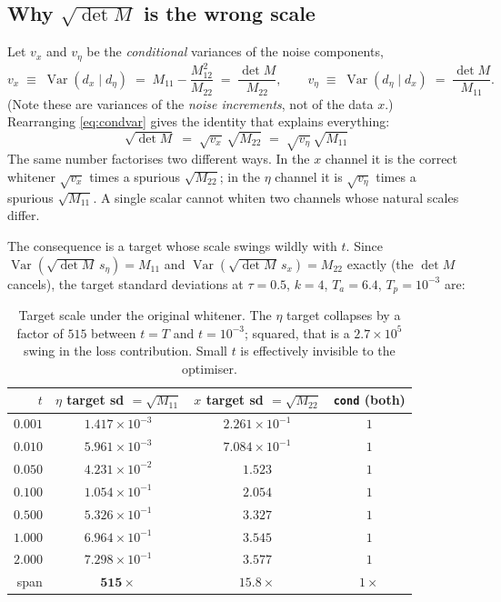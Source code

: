 \documentclass[11pt]{article}
\newcommand{\Tp}{T_p}
\newcommand{\Ta}{T_a}
\newcommand{\kk}{k}
\newcommand{\tauu}{\tau}
\DeclareMathOperator{\Var}{Var}
\begin{document}
\subsection{Why $\sqrt{\det M}$ is the wrong scale}

Let $v_x$ and $v_\eta$ be the \emph{conditional} variances of the noise components,
\begin{equation}
v_x \;\equiv\; \Var(d_x \mid d_\eta) \;=\; M_{11}-\frac{M_{12}^{2}}{M_{22}} \;=\; \frac{\det M}{M_{22}},
\qquad
v_\eta \;\equiv\; \Var(d_\eta \mid d_x) \;=\; \frac{\det M}{M_{11}} .
\label{eq:condvar}
\end{equation}
(Note these are variances of the \emph{noise increments}, not of the data $x$.) Rearranging
\eqref{eq:condvar} gives the identity that explains everything:
\begin{equation}
\boxed{\;\sqrt{\det M} \;=\; \sqrt{v_x}\,\sqrt{M_{22}} \;=\; \sqrt{v_\eta}\,\sqrt{M_{11}}\;}
\label{eq:identity}
\end{equation}
The same number factorises two different ways. In the $x$ channel it is the correct
whitener $\sqrt{v_x}$ times a spurious $\sqrt{M_{22}}$; in the $\eta$ channel it is
$\sqrt{v_\eta}$ times a spurious $\sqrt{M_{11}}$. A single scalar cannot whiten two
channels whose natural scales differ.

The consequence is a target whose scale swings wildly with $t$. Since
$\Var(\sqrt{\det M}\,s_\eta)=M_{11}$ and $\Var(\sqrt{\det M}\,s_x)=M_{22}$ exactly
(the $\det M$ cancels), the target standard deviations at $\tauu=0.5$, $\kk=4$,
$\Ta=6.4$, $\Tp=10^{-3}$ are:

\begin{table}[h]
\centering\small
\begin{tabular}{rccc}
\toprule
$t$ & $\eta$ target sd $=\sqrt{M_{11}}$ & $x$ target sd $=\sqrt{M_{22}}$ & \texttt{cond} (both)\\
\midrule
$0.001$ & $1.417\times10^{-3}$ & $2.261\times10^{-1}$ & $1$\\
$0.010$ & $5.961\times10^{-3}$ & $7.084\times10^{-1}$ & $1$\\
$0.050$ & $4.231\times10^{-2}$ & $1.523$              & $1$\\
$0.100$ & $1.054\times10^{-1}$ & $2.054$              & $1$\\
$0.500$ & $5.326\times10^{-1}$ & $3.327$              & $1$\\
$1.000$ & $6.964\times10^{-1}$ & $3.545$              & $1$\\
$2.000$ & $7.298\times10^{-1}$ & $3.577$              & $1$\\
\midrule
span & $\mathbf{515\times}$ & $15.8\times$ & $1\times$\\
\bottomrule
\end{tabular}
\caption{Target scale under the original whitener. The $\eta$ target collapses by a factor
of $515$ between $t=T$ and $t=10^{-3}$; squared, that is a $2.7\times10^{5}$ swing in the
loss contribution. Small $t$ is effectively invisible to the optimiser.}
\label{tab:scales}
\end{table}
\end{document}
